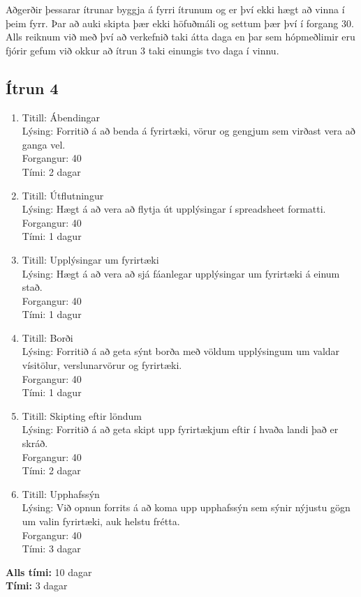 \documentclass[a4,12pt]{article}
\begin{document}
Aðgerðir þessarar ítrunar byggja á fyrri ítrunum og er því ekki hægt að vinna í þeim fyrr. Þar að auki skipta þær ekki höfuðmáli og settum þær því í forgang 30. Alls reiknum við með því að verkefnið taki átta daga en þar sem hópmeðlimir eru fjórir gefum við okkur að ítrun 3 taki einungis tvo daga í vinnu.

\subsection{Ítrun 4}
\begin{enumerate}[]
\item Titill: Ábendingar\\
Lýsing: Forritið á að benda á fyrirtæki, vörur og gengjum sem virðast vera að ganga vel.\\
Forgangur: 40\\
Tími: 2 dagar

\item Titill: Útflutningur\\
Lýsing: Hægt á að vera að flytja út upplýsingar í spreadsheet formatti.\\
Forgangur: 40\\
Tími: 1 dagur

\item Titill: Upplýsingar um fyrirtæki\\
Lýsing: Hægt á að vera að sjá fáanlegar upplýsingar um fyrirtæki á einum stað.\\
Forgangur: 40\\
Tími: 1 dagur

\item Titill: Borði\\
Lýsing: Forritið á að geta sýnt borða með völdum upplýsingum um valdar vísitölur, verslunarvörur og fyrirtæki.\\
Forgangur: 40\\
Tími: 1 dagur

\item Titill: Skipting eftir löndum\\
Lýsing: Forritið á að geta skipt upp fyrirtækjum eftir í hvaða landi það er skráð.\\
Forgangur: 40\\
Tími: 2 dagar

\item Titill: Upphafssýn\\
Lýsing: Við opnun forrits á að koma upp upphafssýn sem sýnir nýjustu gögn um valin fyrirtæki, auk helstu frétta.\\
Forgangur: 40\\
Tími: 3 dagar
\end{enumerate}
\textbf{Alls tími:} 10 dagar\\
\textbf{Tími:} 3 dagar\\
\end{document}
